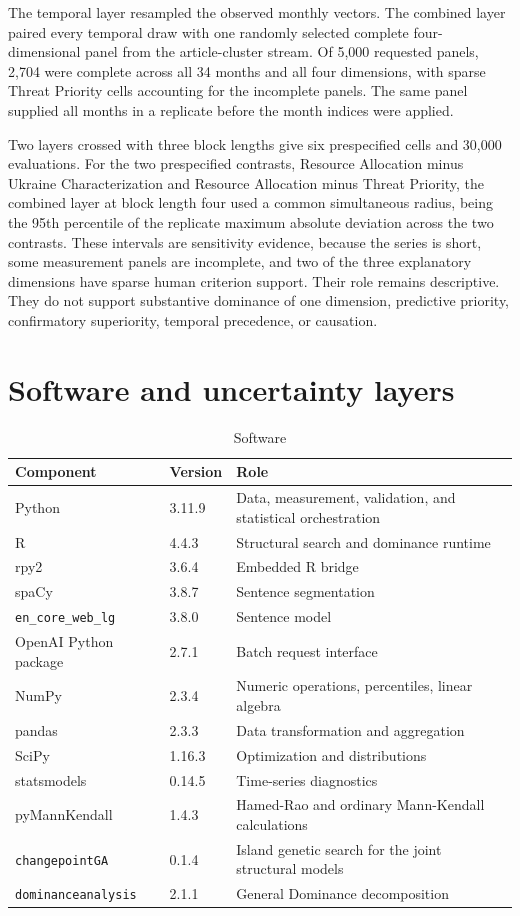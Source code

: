 The temporal layer resampled the observed monthly vectors. The combined layer paired every temporal draw with one randomly selected complete four-dimensional panel from the article-cluster stream. Of 5,000 requested panels, 2,704 were complete across all 34 months and all four dimensions, with sparse Threat Priority cells accounting for the incomplete panels. The same panel supplied all months in a replicate before the month indices were applied.

Two layers crossed with three block lengths give six prespecified cells and 30,000 evaluations. For the two prespecified contrasts, Resource Allocation minus Ukraine Characterization and Resource Allocation minus Threat Priority, the combined layer at block length four used a common simultaneous radius, being the 95th percentile of the replicate maximum absolute deviation across the two contrasts. These intervals are sensitivity evidence, because the series is short, some measurement panels are incomplete, and two of the three explanatory dimensions have sparse human criterion support. Their role remains descriptive. They do not support substantive dominance of one dimension, predictive priority, confirmatory superiority, temporal precedence, or causation.

\section{Software and uncertainty layers}

\begin{table}[htbp]
\centering\small
\caption{Software}
\begin{tabular}{@{}p{}p{}p{}@{}}
\toprule
\textbf{Component} & \textbf{Version} & \textbf{Role} \\
\midrule
Python & 3.11.9 & Data, measurement, validation, and statistical orchestration \\
R & 4.4.3 & Structural search and dominance runtime \\
rpy2 & 3.6.4 & Embedded R bridge \\
spaCy & 3.8.7 & Sentence segmentation \\
\texttt{en\_core\_web\_lg} & 3.8.0 & Sentence model \\
OpenAI Python package & 2.7.1 & Batch request interface \\
NumPy & 2.3.4 & Numeric operations, percentiles, linear algebra \\
pandas & 2.3.3 & Data transformation and aggregation \\
SciPy & 1.16.3 & Optimization and distributions \\
statsmodels & 0.14.5 & Time-series diagnostics \\
pyMannKendall & 1.4.3 & Hamed-Rao and ordinary Mann-Kendall calculations \\
\texttt{changepointGA} & 0.1.4 & Island genetic search for the joint structural models \\
\texttt{dominanceanalysis} & 2.1.1 & General Dominance decomposition \\
\bottomrule
\end{tabular}
\end{table}

